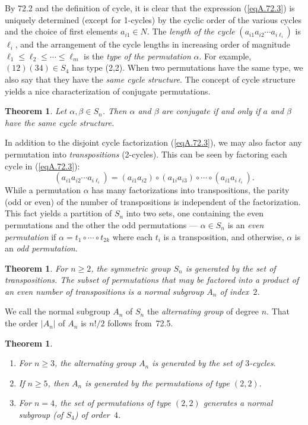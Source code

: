 \documentclass{surv-l}
\numberwithin{equation}{section}
\numberwithin{table}{section}
\numberwithin{figure}{section}
\newtheorem{theorem}[equation]{Theorem}
\theoremstyle{definition}
\begin{document}
By 72.2 and the definition of cycle, it is clear that the
expression (\ref{eqA.72.3}) is uniquely determined (except for
1-cycles) by the cyclic order of the various cycles and the choice
of first elements $a_{i1}\in N$. The \emph{length of the cycle}
$(a_{i1}a_{i2}\cdots a_{i\ell_{i}})$ is $\ell_{i}$, and the
arrangement of the cycle lengths in increasing order of magnitude
$\ell_{1}\leq \ell_{2}\leq\cdots\leq\ell_{m}$ is the \emph{type of
the permutation} $\alpha$. For example, $(12)(34) \in S_{4}$ has
type (2,2). When two permutations have the same type, we also say
that they have the \emph{same cycle structure}. The concept of
cycle structure yields a nice characterization of conjugate
permutations.

\begin{theorem}\label{thmA.72.4}
Let $\alpha,\beta\in S_{n}$. Then $\alpha$ and $\beta$ are
conjugate if and only if $a$ and $\beta$ have the same cycle
structure.
\end{theorem}

In addition to the disjoint cycle factorization (\ref{eqA.72.3}),
we may also factor any permutation into \emph{transpositions}
(2-cycles). This can be seen by factoring each cycle in
(\ref{eqA.72.3}):
\[
(a_{i1}a_{i2}\cdots a_{i\ell_{i}})=(a_{i1}a_{i2})\circ(a_{1i}a_{i3})\circ\cdots\circ(a_{i1}a_{i\ell_{i}}).
\]
While a permutation $\alpha$ has many factorizations into
transpositions, the parity (odd or even) of the number of
transpositions is independent of the factorization. This fact
yields a partition of $S_{n}$ into two sets, one containing
the even permutations and the other the odd permutations
--- $\alpha\in S_{n}$ is an \emph{even permutation} if
$\alpha=t_{1}\circ \cdots \circ t_{2k}$ where each $t_{i}$ is a
transposition, and otherwise, $\alpha$ is an \emph{odd
permutation}.

\begin{theorem}\label{thmA.72.5}
For $n \geq 2$, the symmetric group $S_{n}$
is generated by the set of transpositions. The subset of
permutations that may be factored into a product of an even number
of transpositions is a normal subgroup $A_{n}$ of index~$2$.
\end{theorem}

We call the normal subgroup $A_{n}$ of $S_{n}$ the
\emph{alternating group} of degree $n$.
That the order $|A_{n}|$ of $A_{n}$ is $n!/2$ follows from~72.5.

\begin{theorem}\label{thmA.72.6}\hfill
\begin{enumerate}
\item[(\emph{i})] For $n\geq 3$, the alternating group $A_{n}$
is generated by the set of $3$-cycles.

\item[(\emph{ii})] If $n \geq 5$, then $A_{n}$ is generated
by the permutations of type $(2,2)$.

\item[(\emph{iii})] For $n =4$, the set of permutations of type
$(2, 2)$ generates a normal subgroup (of $S_{4}$) of order~$4$.
\end{enumerate}
\end{theorem}
\end{document}

